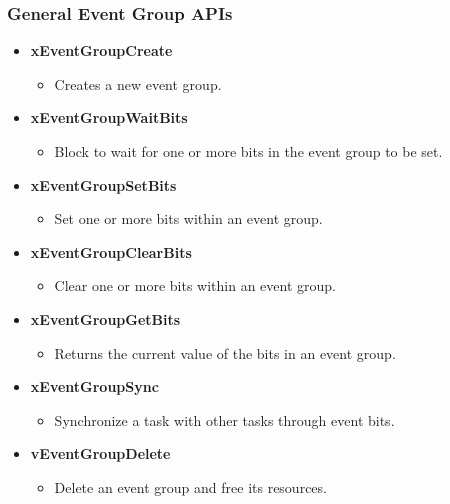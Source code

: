 \documentclass[10pt]{beamer}
\begin{document}
\begin{frame}
    \frametitle{General Event Group APIs}
    \begin{itemize}
      \item \textbf{xEventGroupCreate}
      \begin{itemize}
        \item Creates a new event group.
      \end{itemize}
      \item \textbf{xEventGroupWaitBits}
      \begin{itemize}
        \item Block to wait for one or more bits in the event group to be set.
      \end{itemize}
      \item \textbf{xEventGroupSetBits}
      \begin{itemize}
        \item Set one or more bits within an event group.
      \end{itemize}
      \item \textbf{xEventGroupClearBits}
      \begin{itemize}
        \item Clear one or more bits within an event group.
      \end{itemize}
      \item \textbf{xEventGroupGetBits}
      \begin{itemize}
        \item Returns the current value of the bits in an event group.
      \end{itemize}
      \item \textbf{xEventGroupSync}
      \begin{itemize}
        \item Synchronize a task with other tasks through event bits.
      \end{itemize}
      \item \textbf{vEventGroupDelete}
      \begin{itemize}
        \item Delete an event group and free its resources.
      \end{itemize}
    \end{itemize}
\end{frame}
\end{document}
